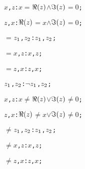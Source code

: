 \begin{alltt}
  \pvsid{(}\(x\), \(z\)\pvsid{)}:  \pvskey{=} \(x\) \(=\) \(\Reonefn{z}\) \(\wedge\) \(\Imonefn{z}\) \(=\) \(0\);\vspace*{\pvsdeclspacing}

  \pvsid{(}\(z\), \(x\)\pvsid{)}:  \pvskey{=} \(\Reonefn{z}\) \(=\) \(x\) \(\wedge\) \(\Imonefn{z}\) \(=\) \(0\);\vspace*{\pvsdeclspacing}

  \(=\)\pvsid{(}\(z\sb{1}\), \(z\sb{2}\)\pvsid{)}:   \pvskey{=} \pvsid{(}\(z\sb{1}\), \(z\sb{2}\)\pvsid{)};\vspace*{\pvsdeclspacing}

  \(=\)\pvsid{(}\(x\), \(z\)\pvsid{)}:   \pvskey{=} \pvsid{(}\(x\), \(z\)\pvsid{)};\vspace*{\pvsdeclspacing}

  \(=\)\pvsid{(}\(z\), \(x\)\pvsid{)}:   \pvskey{=} \pvsid{(}\(z\), \(x\)\pvsid{)};\vspace*{\pvsdeclspacing}

  \pvsid{(}\(z\sb{1}\), \(z\sb{2}\)\pvsid{)}:  \pvskey{=} \(\neg\) \pvsid{(}\(z\sb{1}\), \(z\sb{2}\)\pvsid{)};\vspace*{\pvsdeclspacing}

  \pvsid{(}\(x\), \(z\)\pvsid{)}:  \pvskey{=} \(x\) \(\neq\) \(\Reonefn{z}\) \(\vee\) \(\Imonefn{z}\) \(\neq\) \(0\);\vspace*{\pvsdeclspacing}

  \pvsid{(}\(z\), \(x\)\pvsid{)}:  \pvskey{=} \(\Reonefn{z}\) \(\neq\) \(x\) \(\vee\) \(\Imonefn{z}\) \(\neq\) \(0\);\vspace*{\pvsdeclspacing}

  \(\neq\)\pvsid{(}\(z\sb{1}\), \(z\sb{2}\)\pvsid{)}:   \pvskey{=} \pvsid{(}\(z\sb{1}\), \(z\sb{2}\)\pvsid{)};\vspace*{\pvsdeclspacing}

  \(\neq\)\pvsid{(}\(x\), \(z\)\pvsid{)}:   \pvskey{=} \pvsid{(}\(x\), \(z\)\pvsid{)};\vspace*{\pvsdeclspacing}

  \(\neq\)\pvsid{(}\(z\), \(x\)\pvsid{)}:   \pvskey{=} \pvsid{(}\(z\), \(x\)\pvsid{)};\vspace*{\pvsdeclspacing}


\end{alltt}
